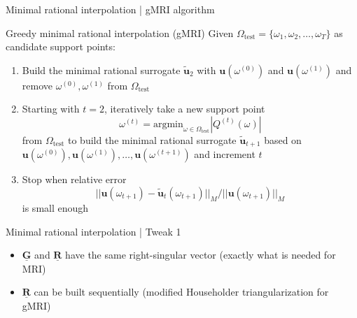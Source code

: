 \documentclass{beamer}
\begin{document}
\begin{frame}{Minimal rational interpolation | gMRI algorithm}
    
    \begin{block}{Greedy minimal rational interpolation (gMRI) \cite{shortMRI}}
        Given $\Omega_{\text{test}} = \{\omega_1, \omega_2, \dots, \omega_T\}$ as candidate support points:
        \begin{enumerate}
            \item<2-> Build the minimal rational surrogate $\mathbf{\tilde{u}}_{2}$
                      with $\mathbf{u}(\omega^{(0)})$ and $\mathbf{u}(\omega^{(1)})$
                      and remove $\omega^{(0)}, \omega^{(1)}$ from $\Omega_{\text{test}}$
            \item<3-> Starting with $t=2$, iteratively take a new support point
            \begin{equation*}
                \omega^{(t)} = \text{argmin}_{\omega \in \Omega_{\text{test}}} |Q^{(t)}(\omega)|
            \end{equation*}
            from $\Omega_{\text{test}}$ to build the minimal rational surrogate $\mathbf{\tilde{u}}_{t+1}$
            based on $\mathbf{u}(\omega^{(0)}), \mathbf{u}(\omega^{(1)}), \dots, \mathbf{u}(\omega^{(t+1)})$
            and increment $t$
            \item<4-> Stop when relative error 
            \begin{equation*}
                ||\mathbf{u}(\omega_{t+1}) - \mathbf{\tilde{u}}_{t}(\omega_{t+1})||_M / ||\mathbf{u}(\omega_{t+1})||_M
            \end{equation*}
            is small enough
        \end{enumerate}
    \end{block}

\end{frame}

\begin{frame}{Minimal rational interpolation | Tweak 1}
    
    \begin{itemize}
        \item<2-> $\mathbf{\underline{G}}$ and $\mathbf{\underline{R}}$ have
        the same right-singular vector (exactly what is needed for MRI)
        \item<3-> $\mathbf{\underline{R}}$ can be built sequentially (modified
        Householder triangularization for gMRI)
    \end{itemize}
    
\end{frame}
\end{document}
